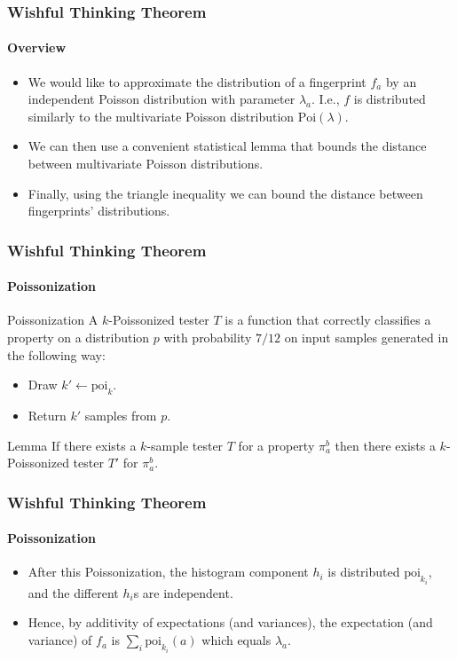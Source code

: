 \documentclass{beamer}
\begin{document}
\begin{frame}
  \frametitle{Wishful Thinking Theorem} \framesubtitle{Overview}

  \begin{itemize}
  \item We would like to approximate the distribution of a fingerprint
    $f_a$ by an independent Poisson distribution with parameter
    $\lambda_a$. I.e., $f$ is distributed similarly to the
    multivariate Poisson distribution $\mbox{Poi}(\lambda)$.
  \item We can then use a convenient statistical lemma that bounds the
    distance between multivariate Poisson distributions.
  \item Finally, using the triangle inequality we can bound the
    distance between fingerprints' distributions.
  \end{itemize}

\end{frame}

\begin{frame}
  \frametitle{Wishful Thinking Theorem} \framesubtitle{Poissonization}

  \begin{block}{Poissonization}
    A $k$-Poissonized tester $T$ is a function that correctly
    classifies a property on a distribution $p$ with probability
    $7/12$ on input samples generated in the following way:
    \begin{itemize}
    \item Draw $k'\leftarrow \mbox{poi}_k$.
    \item Return $k'$ samples from $p$.
    \end{itemize}
  \end{block}

  \begin{block}{Lemma}
    If there exists a $k$-sample tester $T$ for a property $\pi_a^b$
    then there exists a $k$-Poissonized tester $T'$ for $\pi_a^b$.
  \end{block}
  
\end{frame}

\begin{frame}
  \frametitle{Wishful Thinking Theorem} \framesubtitle{Poissonization}

  
  \begin{itemize}
  \item After this Poissonization, the histogram component $h_i$ is
    distributed $\mbox{poi}_{k_i}$, and the different $h_i$s are independent.
  \item Hence, by additivity of expectations (and variances), the
    expectation (and variance) of $f_a$ is $\sum_i\mbox{poi}_{k_i}(a)$
    which equals $\lambda_a$.
  \end{itemize}
  
\end{frame}
\end{document}

